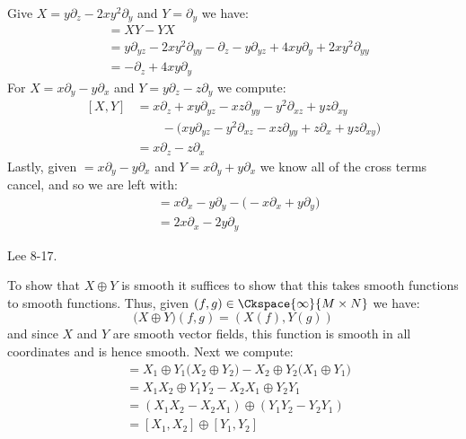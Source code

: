     \begin{solution}
        Give $X=y\partial_{z}-2xy^{2}\partial_{y}$ and $Y=\partial_{y}$ we
        have:
        \begin{align}
            [X,Y]&=XY-YX\\
                &=y\partial_{yz}-2xy^{2}\partial_{yy}
                    -\partial_{z}-y\partial_{yz}+4xy\partial_{y}+
                    2xy^{2}\partial_{yy}\\
                &=\minus\partial_{z}+4xy\partial_{y}
        \end{align}
        For $X=x\partial_{y}-y\partial_{x}$ and
        $Y=y\partial_{z}-z\partial_{y}$ we compute:
        \begin{align}
            \nonumber
            [X,Y]&=x\partial_{z}+xy\partial_{yz}-xz\partial_{yy}
                -y^{2}\partial_{xz}+yz\partial_{xy}\\
                &\quad\quad
                -\Big(xy\partial_{yz}-y^{2}\partial_{xz}-xz\partial_{yy}
                    +z\partial_{x}+yz\partial_{xy}\Big)\\
                &=x\partial_{z}-z\partial_{x}
        \end{align}
        Lastly, given $=x\partial_{y}-y\partial_{x}$ and
        $Y=x\partial_{y}+y\partial_{x}$ we know all of the cross terms
        cancel, and so we are left with:
        \begin{align}
            [X,Y]&=x\partial_{x}-y\partial_{y}-
                    \big(\minus{x}\partial_{x}+y\partial_{y}\big)\\
                &=2x\partial_{x}-2y\partial_{y}
        \end{align}
    \end{solution}
    \begin{problem}
        Lee 8-17.
    \end{problem}
    \begin{solution}
        To show that $X\oplus{Y}$ is smooth it suffices to show that this
        takes smooth functions to smooth functions. Thus, given
        $(f,g)\in\Ckspace{\infty}{M\times{N}}$ we have:
        \begin{equation}
            \big(X\oplus{Y}\big)(f,g)=(X(f),{Y}(g))
        \end{equation}
        and since $X$ and $Y$ are smooth vector fields, this function is
        smooth in all coordinates and is hence smooth. Next we compute:
        \begin{align}
            [X_{1}\oplus{Y}_{1},X_{2}\oplus{Y}_{2}]&=
                X_{1}\oplus{Y}_{1}\big(X_{2}\oplus{Y}_{2}\big)-
                X_{2}\oplus{Y}_{2}\big(X_{1}\oplus{Y}_{1}\big)\\
            &=X_{1}X_{2}\oplus{Y}_{1}Y_{2}-X_{2}X_{1}\oplus{Y}_{2}Y_{1}\\
            &=(X_{1}X_{2}-X_{2}X_{1})\oplus(Y_{1}Y_{2}-Y_{2}Y_{1})\\
            &=[X_{1},X_{2}]\oplus[Y_{1},Y_{2}]
        \end{align}
    \end{solution}

